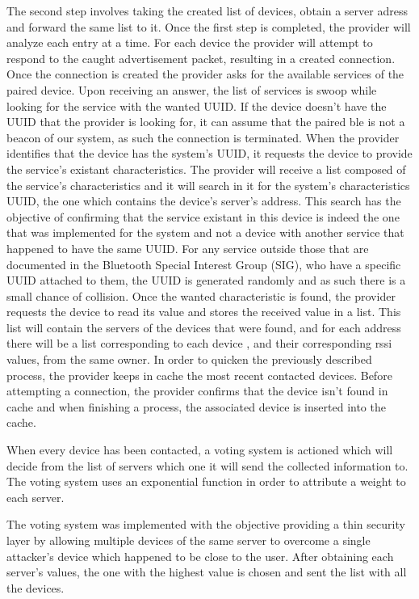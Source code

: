 \documentclass[a4paper]{IEEEtran}
\begin{document}
The second step involves taking the created list of devices, obtain a server adress and forward the same list to it. Once the first step is completed, the provider will analyze each entry at a time. For each device the provider will attempt to respond to the caught advertisement packet, resulting in a created connection.  Once the connection is created the provider asks for the available services of the paired device. Upon receiving an answer, the list of services is swoop while looking for the service with the wanted UUID. If the device doesn't have the UUID that the provider is looking for, it can assume that the paired ble is not a beacon of our system, as such the connection is terminated. When the provider identifies that the device has the system's UUID, it requests the device to provide the service's existant characteristics. The provider will receive a list composed of the service's characteristics and it will search in it for the system's characteristics UUID, the one which contains the device's server's address. This search has the objective of confirming that the service existant in this device is indeed the one that was implemented for the system and not a device with another service that happened to have the same UUID. For any service outside those that are documented in the Bluetooth Special Interest Group (SIG), who have a specific UUID attached to them, the UUID is generated randomly and as such there is a small chance of collision. Once the wanted characteristic is found, the provider requests the device to read its value and stores the received value in a list. This list will contain the servers of the devices that were found, and for each address there will be a list corresponding to each device , and their corresponding rssi values, from the same owner. In order to quicken the previously described process, the provider keeps in cache the most recent contacted devices. Before attempting a connection, the provider confirms that the device isn't found in cache and when finishing a process, the associated device is inserted into the cache.

When every device has been contacted, a voting system is actioned which will decide from the list of servers which one it will send the collected information to. The voting system uses an exponential function in order to attribute a weight to each server. 

The voting system was implemented with the objective providing a thin security layer by allowing multiple devices of the same server to overcome a single attacker's device which happened to be close to the user. After obtaining each server's values, the one with the highest value is chosen and sent the list with all the devices. 
\end{document}
